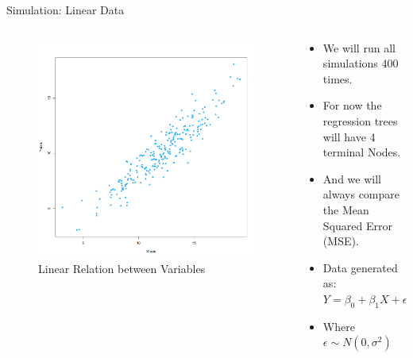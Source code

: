 \documentclass[10pt]{beamer}
\begin{document}
\begin{frame}{Simulation: Linear Data}
    \begin{columns}[T]
        \begin{column}{0.5\textwidth}
            \begin{figure}
                \centering
                \includegraphics[width=1\linewidth]{Linear Data before.png}
                \caption{Linear Relation between Variables}
                \label{fig:sub2}  %
            \end{figure}
        \end{column}
        \begin{column}{0.5\textwidth}
            \begin{itemize}
                \vspace{0.7cm}
                \item We will run all simulations 400 times.
                \item For now the regression trees will have 4 terminal Nodes.
                \item And we will always compare the Mean Squared Error (MSE).
                \item Data generated as: $Y = \beta_0 + \beta_1X + \epsilon$
                \item Where $\epsilon \sim N(0, \sigma^2)$
            \end{itemize}
        \end{column}
    \end{columns}
\end{frame}
\end{document}
